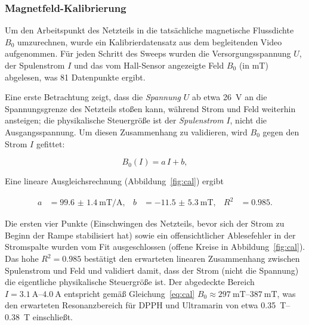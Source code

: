 \documentclass[11pt,a4paper]{article}
\begin{document}
\subsubsection{Magnetfeld-Kalibrierung}
\label{sec:calibration}
Um den Arbeitspunkt des Netzteils in die tatsächliche magnetische Flussdichte
$B_0$ umzurechnen, wurde ein Kalibrierdatensatz aus dem begleitenden Video
aufgenommen. Für jeden Schritt des Sweeps wurden die Versorgungsspannung $U$,
der Spulenstrom $I$ und das vom Hall-Sensor angezeigte Feld $B_0$ (in
\si{\milli\tesla}) abgelesen, was 81 Datenpunkte ergibt.

Eine erste Betrachtung zeigt, dass die \emph{Spannung} $U$ ab etwa
\SI{26}{\volt} an die Spannungsgrenze des Netzteils stoßen kann, während Strom
und Feld weiterhin ansteigen; die physikalische Steuergröße ist der
\emph{Spulenstrom} $I$, nicht die Ausgangsspannung. Um diesen Zusammenhang zu
validieren, wird $B_0$ gegen den Strom $I$ gefittet:

\begin{equation}
    B_0(I) = a\,I + b ,
    \label{eq:cal}
\end{equation}

Eine lineare Ausgleichsrechnung (Abbildung~\ref{fig:cal}) ergibt

\begin{align}
    a &= \SI{99.6(14)}{\milli\tesla\per\ampere}, &
    b &= \SI{-11.5(53)}{\milli\tesla}, &
    R^2 &= 0.985 .
\end{align}

Die ersten vier Punkte (Einschwingen des Netzteils, bevor sich der Strom zu
Beginn der Rampe stabilisiert hat) sowie ein offensichtlicher Ablesefehler in
der Stromspalte wurden vom Fit ausgeschlossen (offene Kreise in
Abbildung~\ref{fig:cal}). Das hohe $R^2 = 0.985$ bestätigt den erwarteten
linearen Zusammenhang zwischen Spulenstrom und Feld und validiert damit, dass
der Strom (nicht die Spannung) die eigentliche physikalische Steuergröße ist.
Der abgedeckte Bereich $I = \SIrange{3.1}{4.0}{\ampere}$ entspricht gemäß
Gleichung~\eqref{eq:cal} $B_0 \approx \SIrange{297}{387}{\milli\tesla}$, was
den erwarteten Resonanzbereich für DPPH und Ultramarin von etwa
\SIrange{0.35}{0.38}{\tesla} einschließt.
\end{document}
